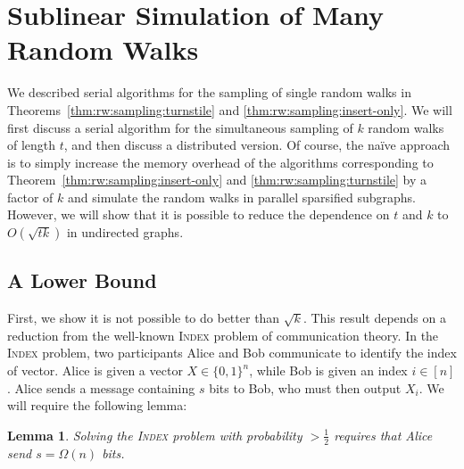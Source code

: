 \documentclass[10]{report}
\newtheorem{lemma}[theorem]{Lemma}
\newcommand{\algoname}[1]{\textnormal{\textsc{#1}}}
\begin{document}


\section{Sublinear Simulation of Many Random Walks}
 \label{walks:sec:walks}

We described serial algorithms for the sampling of single random walks in Theorems~\ref{thm:rw:sampling:turnstile} and \ref{thm:rw:sampling:insert-only}.
We will first discuss a serial algorithm for the simultaneous sampling of $k$ random walks of length $t$, and then discuss a distributed version. 
%
Of course, the na\"ive approach is to simply increase the memory overhead of the algorithms corresponding to Theorem~\ref{thm:rw:sampling:insert-only} and \ref{thm:rw:sampling:turnstile} by a factor of $k$ and simulate the random walks in parallel sparsified subgraphs.
However, we will show that it is possible to reduce the dependence on $t$ and $k$ to $O(\sqrt{tk})$ in undirected graphs.

\subsection{A Lower Bound}
 \label{walks:sec:walks:lb}


First, we show it is not possible to do better than $\sqrt{k}$.
This result depends on a reduction from the well-known \algoname{Index} problem of communication theory.
In the \algoname{Index} problem, two participants Alice and Bob communicate to identify the index of vector.
Alice is given a vector $X \in \{0,1\}^n$, while Bob is given an index $i \in [n]$. 
Alice sends a message containing $s$ bits to Bob, who must then output $X_i$. 
We will require the following lemma:
\begin{lemma} \label{lem:index}
Solving the \algoname{Index} problem with probability $> \frac{1}{2}$ requires that Alice send $s = \Omega(n)$ bits.
\end{lemma}
\end{document}
